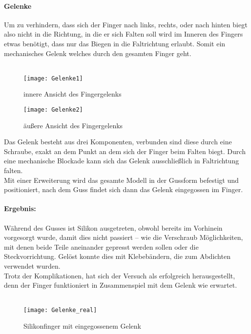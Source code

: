 \documentclass[titlepage,12pt,twoside]{article}
\begin{document}
\paragraph{Gelenke}
\hfill \break
\hfill \break
Um zu verhindern, dass sich der Finger nach links, rechts, oder nach hinten biegt also nicht in die Richtung, in die er sich Falten soll wird im Inneren des Fingers etwas benötigt, dass nur das Biegen in die Faltrichtung erlaubt. Somit ein 
mechanisches Gelenk welches durch den gesamten Finger geht. \\
\\
\begin{figure}[H]
	\begin{center}
		\scalebox{0.8}
		{\texttt{[image: Gelenke1]}}
		\caption{innere Ansicht des Fingergelenks}
		\label{fig:Gelenke1}			
	\end{center}
\end{figure}
\begin{figure}[H]
	\begin{center}
		\scalebox{0.8}
		{\texttt{[image: Gelenke2]}}
		\caption{äußere Ansicht des Fingergelenks}
		\label{fig:Gelenke2}			
	\end{center}
\end{figure}
\hfill \break
Das Gelenk besteht aus drei Komponenten, verbunden sind diese durch eine Schraube, exakt an dem Punkt an dem sich der Finger beim Falten biegt. Durch eine mechanische Blockade kann sich das Gelenk ausschließlich in Faltrichtung falten. \\
Mit einer Erweiterung wird das gesamte Modell in der Gussform befestigt und positioniert, nach dem Guss findet sich dann das Gelenk eingegossen im Finger. \\
\\
\textbf{Ergebnis:} \\
\\
Während des Gusses ist Silikon ausgetreten, obwohl bereits im Vorhinein vorgesorgt wurde, damit dies nicht passiert – wie die Verschraub Möglichkeiten, mit denen beide Teile aneinander gepresst werden sollen oder die Steckvorrichtung. 
Gelöst konnte dies mit Klebebändern, die zum Abdichten verwendet wurden. \\
Trotz der Komplikationen, hat sich der Versuch als erfolgreich herausgestellt, denn der Finger funktioniert in Zusammenspiel mit dem Gelenk wie erwartet. \\
\\
\begin{figure}[H]
	\begin{center}
		\scalebox{0.8}
		{\texttt{[image: Gelenke\_real]}}
		\caption{Silikonfinger mit eingegossenem Gelenk}
		\label{fig:Gelenke_real}			
	\end{center}
\end{figure}
\hfill \break
\end{document}
